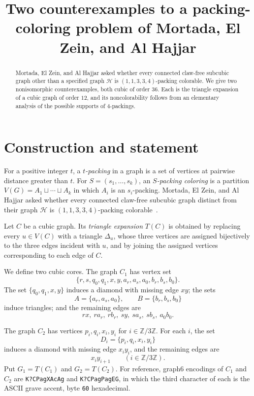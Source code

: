 \documentclass[11pt]{amsart}
\title[Counterexamples to a packing-coloring problem]
{Two counterexamples to a packing-coloring problem of Mortada, El Zein, and Al Hajjar}
\date{}
\newcommand{\Zthree}{\mathbb Z/3\mathbb Z}
\begin{document}
\begin{abstract}
Mortada, El Zein, and Al Hajjar asked whether every connected claw-free
subcubic graph other than a specified graph $\mathcal H$ is
$(1,1,3,3,4)$-packing colorable. We give two nonisomorphic counterexamples,
both cubic of order $36$. Each is the triangle expansion of a cubic graph
of order $12$, and its noncolorability follows from an elementary analysis
of the possible supports of $4$-packings.
\end{abstract}

\maketitle

\section{Construction and statement}

For a positive integer $t$, a \emph{$t$-packing} in a graph is a set of
vertices at pairwise distance greater than $t$. For
$S=(s_1,\ldots,s_k)$, an \emph{$S$-packing coloring} is a partition
$V(G)=A_1\sqcup\cdots\sqcup A_k$ in which $A_i$ is an $s_i$-packing.
Mortada, El Zein, and Al Hajjar asked whether every connected claw-free
subcubic graph distinct from their graph $\mathcal H$ is
$(1,1,3,3,4)$-packing colorable~\cite[Problem~1]{MEH}.

Let $C$ be a cubic graph. Its \emph{triangle expansion} $T(C)$ is obtained
by replacing every $u\in V(C)$ with a triangle $\Delta_u$, whose three
vertices are assigned bijectively to the three edges incident with $u$,
and by joining the assigned vertices corresponding to each edge of $C$.

We define two cubic cores. The graph $C_1$ has vertex set
\[
 \{r,s,q_0,q_1,x,y,a_r,a_s,a_0,b_r,b_s,b_0\}.
\]
The set $\{q_0,q_1,x,y\}$ induces a diamond with missing edge $xy$; the
sets
\[
 A=\{a_r,a_s,a_0\},\qquad B=\{b_r,b_s,b_0\}
\]
induce triangles; and the remaining edges are
\[
 rx,\ ra_r,\ rb_r,\ sy,\ sa_s,\ sb_s,\ a_0b_0.
\]

The graph $C_2$ has vertices $p_i,q_i,x_i,y_i$ for $i\in\Zthree$. For
each $i$, the set
\[
 D_i=\{p_i,q_i,x_i,y_i\}
\]
induces a diamond with missing edge $x_i y_i$, and the remaining edges are
\[
 x_i y_{i+1}\qquad(i\in\Zthree).
\]
Put $G_1=T(C_1)$ and $G_2=T(C_2)$. For reference, graph6 encodings of
$C_1$ and $C_2$ are \texttt{K?\textasciigrave CPagXAcAg} and
\texttt{K?\textasciigrave CPagPagEG}, in which the third character of each
is the ASCII grave accent, byte \texttt{60} hexadecimal.
\end{document}
